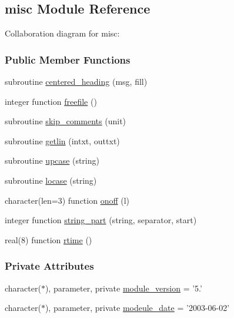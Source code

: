 \hypertarget{classmisc}{\subsection{misc Module Reference}
\label{classmisc}
}


Collaboration diagram for misc\-:
\subsubsection*{Public Member Functions}
\begin{DoxyCompactItemize}
\item 
subroutine \hyperlink{classmisc_ac616bbb70212f3216e099c51f3c217f9}{centered\-\_\-heading} (msg, fill)
\item 
integer function \hyperlink{classmisc_aaa874447823dfa2d2c7fcf6eb80ebd70}{freefile} ()
\item 
subroutine \hyperlink{classmisc_ac0206a84cf8753b6b32b7796a9b6ac39}{skip\-\_\-comments} (unit)
\item 
subroutine \hyperlink{classmisc_a49b44c33311a31e874439a6f3caf5801}{getlin} (intxt, outtxt)
\item 
subroutine \hyperlink{classmisc_a3d25ef800766f590365955680ff3ba2c}{upcase} (string)
\item 
subroutine \hyperlink{classmisc_a809b24676ebbae2412332b832c612c3c}{locase} (string)
\item 
character(len=3) function \hyperlink{classmisc_a6b7b9b56cdaec975997a7e45ab6e2c22}{onoff} (l)
\item 
integer function \hyperlink{classmisc_abe9cbcff4722ab41cde9244e8feeb31f}{string\-\_\-part} (string, separator, start)
\item 
real(8) function \hyperlink{classmisc_abd36d3dd3b5378bb78142330bd270555}{rtime} ()
\end{DoxyCompactItemize}
\subsubsection*{Private Attributes}
\begin{DoxyCompactItemize}
\item 
character($\ast$), parameter, private \hyperlink{classmisc_a6c9481cfaef19b644899abcb7651f9a4}{module\-\_\-version} = '5.'
\item 
character($\ast$), parameter, private \hyperlink{classmisc_ad45c52c02a8474df0422e2b0046e2d54}{modeule\-\_\-date} = '2003-\/06-\/02'
\end{DoxyCompactItemize}


